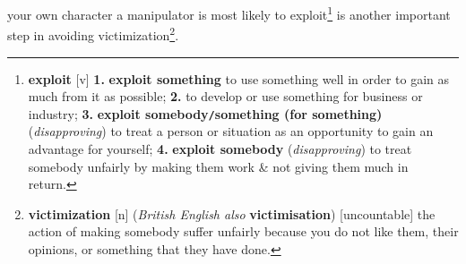 \documentclass[oneside]{book}
\numberwithin{equation}{section}
\begin{document}
your own character a manipulator is most likely to exploit\footnote{\textbf{exploit} [v] \textbf{1.} \textbf{exploit something} to use something well in order to gain as much from it as possible; \textbf{2.} to develop or use something for business or industry; \textbf{3.} \textbf{exploit somebody\texttt{/}something (for something)} (\textit{disapproving}) to treat a person or situation as an opportunity to gain an advantage for yourself; \textbf{4.} \textbf{exploit somebody} (\textit{disapproving}) to treat somebody unfairly by making them work \& not giving them much in return.} is another important step in avoiding victimization\footnote{\textbf{victimization} [n] (\textit{British English also} \textbf{victimisation}) [uncountable] the action of making somebody suffer unfairly because you do not like them, their opinions, or something that they have done.}.
\end{document}
